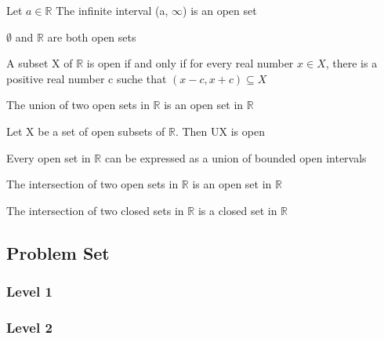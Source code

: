 \documentclass{article}
\begin{document}
\begin{definition}
\end{definition}

\begin{theorem}
    Let $a \in \mathbb{R}$ The infinite interval (a, $\infty$) is an open set
\end{theorem}

\begin{theorem}
    $\emptyset $ and $\mathbb{R}$ are both open sets
\end{theorem}

\begin{theorem}
    A subset X of $\mathbb{R}$ is open if and only if for every real number
    $x \in X$, there is a positive real number c suche that $(x-c, x+c) \subseteq X$
\end{theorem}

\begin{theorem}
    The union of two open sets in $\mathbb{R}$ is an open set in $\mathbb{R}$
\end{theorem}

\begin{theorem}
    Let X be a set of open subsets of $\mathbb{R}$. Then UX is open
\end{theorem}

\begin{theorem}
    Every open set in $\mathbb{R}$ can be expressed as a union of bounded open
    intervals
\end{theorem}

\begin{theorem}
    The intersection of two open sets in $\mathbb{R}$ is an open set in $\mathbb{R}$
\end{theorem}

\begin{theorem}
    The intersection of two closed sets in $\mathbb{R}$ is a closed set in $\mathbb{R}$
\end{theorem}

\subsection{Problem Set}
\subsubsection{Level 1}
\subsubsection{Level 2}
\end{document}
